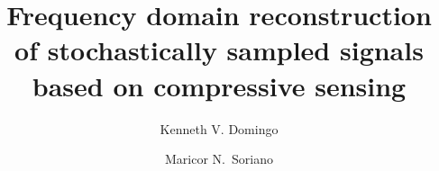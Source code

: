 \documentclass[10pt,a4paper,twoside]{article}
\begin{document}
\title{\TitleFont Frequency domain reconstruction of stochastically sampled signals based on compressive sensing}


\author[*\negthickspace]{Kenneth V. Domingo}
\author[ ]{Maricor N.~Soriano
\lastauthorsep}



\end{document}
